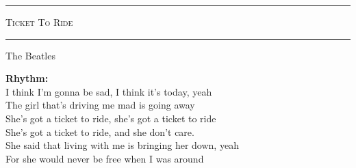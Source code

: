 \documentclass[10pt, twoside, a4paper]{article}
\begin{document}
\begin{center}

	\hrule \vspace{0.2cm}
     	\textsc{\LARGE Ticket To Ride}
	\vspace{0.2cm} \hrule \vspace{0.2cm}
      	{\large The Beatles}
      	
\end{center}


		
\textbf{Rhythm:} %
\\



I think I'm gonna be sad, I think it's today, yeah\\
The girl that's driving me mad is going away  \\

She's got a ticket to ride, she's got a ticket to ride\\
She's got a ticket to ride, and she don't care.\\

She said that living with me is bringing her down, yeah \\
For she would never be free when I was around \\
\end{document}
